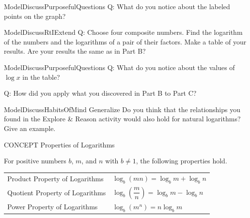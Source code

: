 \documentclass{article}
\newenvironment{concept-box}{}{}        %
\newenvironment{te-addendum}[2]{}{}     %
\newcommand{\answer}[1]{}               %
\begin{document}
\begin{te-addendum}{ModelDiscuss}{PurposefulQuestions}
Q: What do you notice about the labeled points on the graph?
\answer{The $x$-values 3 and 5 are factors of 15.}
\end{te-addendum}

\begin{te-addendum}{ModelDiscuss}{RtIExtend}
Q: Choose four composite numbers. Find the logarithm of the numbers and the logarithms of a pair of their factors. Make a table of your results. Are your results the same as in Part B?
\answer{Yes; the sum of logarithms of the factors is equal to the logarithm of the number.}
\end{te-addendum}

\begin{te-addendum}{ModelDiscuss}{PurposefulQuestions}
Q: What do you notice about the values of $\log x$ in the table?
\answer{The sum of the first two values of $\log x$ is equal to the third value of $\log x$.}
Q: How did you apply what you discovered in Part B to Part C?
\answer{Sample: In Part B, I determined that the sum of the logs of two factors is equal to the log of their product. Because 3 and 15 are factors of 45, I predicted $\log45$ would equal $\log3+\log15$. Similarly, I predicted $\log75$ would equal $\log5+\log15$.}
\end{te-addendum}

\begin{te-addendum}{ModelDiscuss}{HabitsOfMind}
Generalize Do you think that the relationships you found in the Explore \& Reason activity would also hold for natural logarithms? Give an example.
\answer{yes; $\ln3+\ln5=\ln15$}
\end{te-addendum}

\begin{concept-box}
CONCEPT Properties of Logarithms

For positive numbers $b$, $m$, and $n$ with $b\neq1$, the following properties hold.

\begin{tabular}{ll}
Product Property of Logarithms & $\log_b(mn)=\log_b m+\log_b n$ \\
Quotient Property of Logarithms & $\log_b\left(\dfrac{m}{n}\right)=\log_b m-\log_b n$ \\
Power Property of Logarithms & $\log_b(m^n)=n\log_b m$ \\
\end{tabular}
\end{concept-box}
\end{document}
